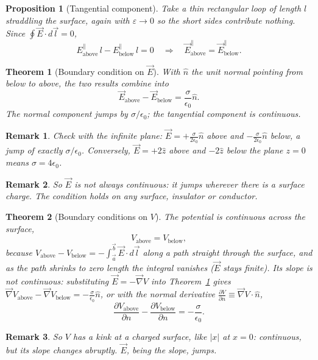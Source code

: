 \documentclass{article}
\newtheorem{theorem}{Theorem}
\newtheorem{remark}{Remark}
\newtheorem{proposition}{Proposition}
\begin{document}
\begin{proposition}[Tangential component]
    Take a thin rectangular loop of length $l$ straddling the surface, again with $\varepsilon \to 0$ so the short sides contribute nothing. Since $\oint\vec{E}\cdot d\vec{l} = 0$,
    \[E^{\parallel}_{\text{above}}\,l - E^{\parallel}_{\text{below}}\,l = 0 \quad\Longrightarrow\quad \vec{E}^{\parallel}_{\text{above}} = \vec{E}^{\parallel}_{\text{below}}.\]
\end{proposition}
\begin{theorem}[Boundary condition on $\vec{E}$]
    \label{BC-E}
    With $\hat{n}$ the unit normal pointing from below to above, the two results combine into
    \begin{equation}
        \vec{E}_{\text{above}} - \vec{E}_{\text{below}} = \frac{\sigma}{\epsilon_0}\hat{n}.
    \end{equation}
    The normal component jumps by $\sigma/\epsilon_0$; the tangential component is continuous.
\end{theorem}
\begin{remark}
    Check with the infinite plane: $\vec{E} = +\frac{\sigma}{2\epsilon_0}\hat{n}$ above and $-\frac{\sigma}{2\epsilon_0}\hat{n}$ below, a jump of exactly $\sigma/\epsilon_0$. Conversely, $\vec{E} = +2\hat{z}$ above and $-2\hat{z}$ below the plane $z = 0$ means $\sigma = 4\epsilon_0$.
\end{remark}
\begin{remark}
    So $\vec{E}$ is not always continuous: it jumps wherever there is a surface charge. The condition holds on any surface, insulator or conductor.
\end{remark}
\begin{theorem}[Boundary conditions on $V$]
    The potential is continuous across the surface,
    \begin{equation}
        V_{\text{above}} = V_{\text{below}},
    \end{equation}
    because $V_{\text{above}} - V_{\text{below}} = -\int_{\vec{a}}^{\vec{b}}\vec{E}\cdot d\vec{l}$ along a path straight through the surface, and as the path shrinks to zero length the integral vanishes ($\vec{E}$ stays finite). Its slope is not continuous: substituting $\vec{E} = -\vec{\nabla}V$ into Theorem~\ref{BC-E} gives $\vec{\nabla}V_{\text{above}} - \vec{\nabla}V_{\text{below}} = -\frac{\sigma}{\epsilon_0}\hat{n}$, or with the normal derivative $\frac{\partial V}{\partial n} \equiv \vec{\nabla}V\cdot\hat{n}$,
    \begin{equation}
        \frac{\partial V_{\text{above}}}{\partial n} - \frac{\partial V_{\text{below}}}{\partial n} = -\frac{\sigma}{\epsilon_0}.
    \end{equation}
\end{theorem}
\begin{remark}
    So $V$ has a kink at a charged surface, like $|x|$ at $x = 0$: continuous, but its slope changes abruptly. $\vec{E}$, being the slope, jumps.
\end{remark}
\end{document}
